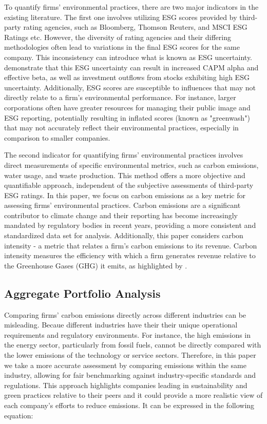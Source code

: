 \documentclass[12pt]{article}
\begin{document}
To quantify firms' environmental practices, there are two major indicators in the existing literature. The first one involves utilizing ESG scores provided by third-party rating agencies, such as Bloomberg, Thomson Reuters, and MSCI ESG Ratings etc. However, the diversity of rating agencies and their differing methodologies often lead to variations in the final ESG scores for the same company. This inconsistency can introduce what is known as ESG uncertainty. \cite{avramov2022sustainable} demonstrate that this ESG uncertainty can result in increased CAPM alpha and effective beta, as well as investment outflows from stocks exhibiting high ESG uncertainty. Additionally, ESG scores are susceptible to influences that may not directly relate to a firm's environmental performance. For instance, larger corporations often have greater resources for managing their public image and ESG reporting, potentially resulting in inflated scores (known as "greenwash") that may not accurately reflect their environmental practices, especially in comparison to smaller companies.

The second indicator for quantifying firms' environmental practices involves direct measurements of specific environmental metrics, such as carbon emissions, water usage, and waste production. This method offers a more objective and quantifiable approach, independent of the subjective assessments of third-party ESG ratings. In this paper, we focus on carbon emissions as a key metric for assessing firms' environmental practices. Carbon emissions are a significant contributor to climate change and their reporting has become increasingly mandated by regulatory bodies in recent years, providing a more consistent and standardized data set for analysis. Additionally, this paper considers carbon intensity - a metric that relates a firm's carbon emissions to its revenue. Carbon intensity measures the efficiency with which a firm generates revenue relative to the Greenhouse Gases (GHG) it emits, as highlighted by \cite{ilhan2021carbon}. 

\subsection{Aggregate Portfolio Analysis}
Comparing firms' carbon emissions directly across different industries can be misleading. Becaue different industries have their their unique operational requirements and regulatory environments. For instance, the high emissions in the energy sector, particularly from fossil fuels, cannot be directly compared with the lower emissions of the technology or service sectors. Therefore, in this paper we take a more accurate assessment by comparing emissions within the same industry, allowing for fair benchmarking against industry-specific standards and regulations. This approach highlights companies leading in sustainability and green practices relative to their peers and it could provide a more realistic view of each company's efforts to reduce emissions. It can be expressed in the following equation:
\end{document}
